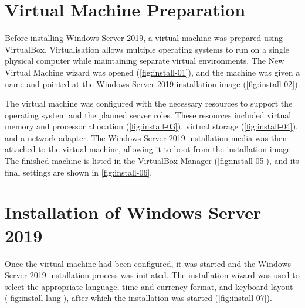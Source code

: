 \section{Virtual Machine Preparation}
\label{sec:install-vm}
Before installing Windows Server 2019, a virtual machine was prepared using VirtualBox. Virtualisation allows multiple operating systems to run on a single physical computer while maintaining separate virtual environments. The New Virtual Machine wizard was opened (\autoref{fig:install-01}), and the machine was given a name and pointed at the Windows Server 2019 installation image (\autoref{fig:install-02}).


The virtual machine was configured with the necessary resources to support the operating system and the planned server roles. These resources included virtual memory and processor allocation (\autoref{fig:install-03}), virtual storage (\autoref{fig:install-04}), and a network adapter. The Windows Server 2019 installation media was then attached to the virtual machine, allowing it to boot from the installation image. The finished machine is listed in the VirtualBox Manager (\autoref{fig:install-05}), and its final settings are shown in \autoref{fig:install-06}.


\section{Installation of Windows Server 2019}
\label{sec:install-os}
Once the virtual machine had been configured, it was started and the Windows Server 2019 installation process was initiated. The installation wizard was used to select the appropriate language, time and currency format, and keyboard layout (\autoref{fig:install-lang}), after which the installation was started (\autoref{fig:install-07}).


